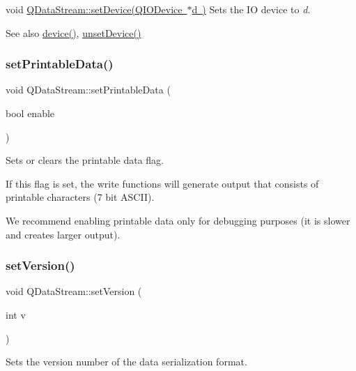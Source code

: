 void \mbox{\hyperlink{class_q_data_stream_aa05d0c83cccfb3f193c365c6ee3bb323}{Q\+Data\+Stream\+::set\+Device(\+Q\+I\+O\+Device $\ast$d )}} Sets the IO device to {\itshape d}. \begin{DoxySeeAlso}{See also}
\mbox{\hyperlink{class_q_data_stream_adb4db2f7dc90c1eb08bcbe1707af2266}{device()}}, \mbox{\hyperlink{class_q_data_stream_a00d9db572b7ce41ea1a8b321b024acbd}{unset\+Device()}} 
\end{DoxySeeAlso}
\mbox{\label{class_q_data_stream_acc3df7d01950ab1a4673019f4f471e8d}} 
\subsubsection{\texorpdfstring{setPrintableData()}{setPrintableData()}}
{\footnotesize\ttfamily void Q\+Data\+Stream\+::set\+Printable\+Data (\begin{DoxyParamCaption}\item[{bool}]{enable }\end{DoxyParamCaption})\hspace{0.3cm}{\ttfamily [inline]}}

Sets or clears the printable data flag.

If this flag is set, the write functions will generate output that consists of printable characters (7 bit A\+S\+C\+II).

We recommend enabling printable data only for debugging purposes (it is slower and creates larger output). \mbox{\label{class_q_data_stream_afdc50005a7d1651a711a54ec0869a22d}} 
\subsubsection{\texorpdfstring{setVersion()}{setVersion()}}
{\footnotesize\ttfamily void Q\+Data\+Stream\+::set\+Version (\begin{DoxyParamCaption}\item[{int}]{v }\end{DoxyParamCaption})\hspace{0.3cm}{\ttfamily [inline]}}

Sets the version number of the data serialization format.

